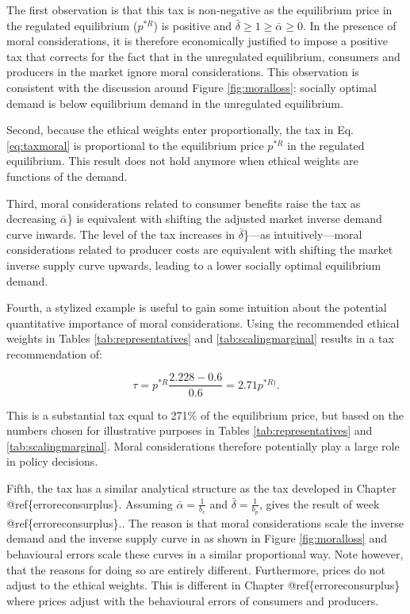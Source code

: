 \documentclass[
]{book}
\begin{document}
The first observation is that this tax is non-negative as the equilibrium price in the regulated equilibrium (\(p^{*R}\)) is positive and \(\bar{\delta} \geq 1 \geq \bar{\alpha} \geq 0\). In the presence of moral considerations, it is therefore economically justified to impose a positive tax that corrects for the fact that in the unregulated equilibrium, consumers and producers in the market ignore moral considerations. This observation is consistent with the discussion around Figure \ref{fig:moralloss}: socially optimal demand is below equilibrium demand in the unregulated equilibrium.

Second, because the ethical weights enter proportionally, the tax in Eq. \eqref{eq:taxmoral} is proportional to the equilibrium price \(p^{*R}\) in the regulated equilibrium. This result does not hold anymore when ethical weights are functions of the demand.

Third, moral considerations related to consumer benefits raise the tax as decreasing \(\bar{\alpha}\)\} is equivalent with shifting the adjusted market inverse demand curve inwards. The level of the tax increases in \(\bar{\delta}\)\}---as intuitively---moral considerations related to producer costs are equivalent with shifting the market inverse supply curve upwards, leading to a lower socially optimal equilibrium demand.

Fourth, a stylized example is useful to gain some intuition about the potential quantitative importance of moral considerations. Using the recommended ethical weights in Tables \ref{tab:representatives} and \ref{tab:scalingmarginal} results in a tax recommendation of:

\begin{equation}
\tau=p^{*R}  \frac{2.228-0.6}{0.6}=2.71 p^{*R)}.
\end{equation}

This is a substantial tax equal to 271\% of the equilibrium price, but based on the numbers chosen for illustrative purposes in Tables \ref{tab:representatives} and \ref{tab:scalingmarginal}. Moral considerations therefore potentially play a large role in policy decisions.

Fifth, the tax has a similar analytical structure as the tax developed in Chapter @ref\{erroreconsurplus\}. Assuming \(\bar{\alpha} = \frac{1}{b_c}\) and \(\bar{\delta} =\frac{1}{b_p}\), gives the result of week @ref\{erroreconsurplus\}.. The reason is that moral considerations scale the inverse demand and the inverse supply curve in as shown in Figure \ref{fig:moralloss} and behavioural errors scale these curves in a similar proportional way. Note however, that the reasons for doing so are entirely different. Furthermore, prices do not adjust to the ethical weights. This is different in Chapter @ref\{erroreconsurplus\} where prices adjust with the behavioural errors of consumers and producers.
\end{document}
